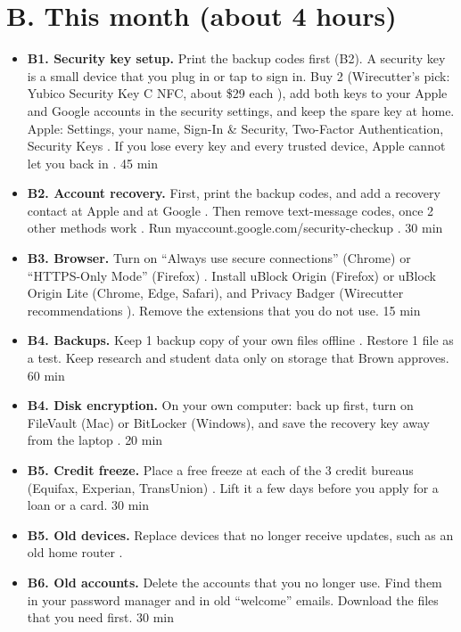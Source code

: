 \documentclass[10pt]{article}
\newcommand{\mins}[1]{\hfill{\footnotesize\color{gray}#1}}
\begin{document}
\section{B. This month (about 4 hours)}
\begin{itemize}
\item \textbf{B1. Security key setup.} Print the backup codes first (B2). A security key is a small device that you plug in or tap to sign in. Buy 2 (Wirecutter's pick: Yubico Security Key C NFC, about \$29 each \vfy), add both keys to your Apple and Google accounts in the security settings, and keep the spare key at home. Apple: Settings, your name, Sign-In \& Security, Two-Factor Authentication, Security Keys \vfy. If you lose every key and every trusted device, Apple cannot let you back in \vfy. \mins{45 min}
\item \textbf{B2. Account recovery.} First, print the backup codes, and add a recovery contact at Apple and at Google \vfy. Then remove text-message codes, once 2 other methods work \vfy. Run myaccount.google.com/security-checkup \vfy. \mins{30 min}
\item \textbf{B3. Browser.} Turn on ``Always use secure connections'' (Chrome) or ``HTTPS-Only Mode'' (Firefox) \vfy. Install uBlock Origin (Firefox) or uBlock Origin Lite (Chrome, Edge, Safari), and Privacy Badger (Wirecutter recommendations \vfy). Remove the extensions that you do not use. \mins{15 min}
\item \textbf{B4. Backups.} Keep 1 backup copy of your own files offline \vfy. Restore 1 file as a test. Keep research and student data only on storage that Brown approves. \mins{60 min}
\item \textbf{B4. Disk encryption.} On your own computer: back up first, turn on FileVault (Mac) or BitLocker (Windows), and save the recovery key away from the laptop \vfy. \mins{20 min}
\item \textbf{B5. Credit freeze.} Place a free freeze at each of the 3 credit bureaus (Equifax, Experian, TransUnion) \vfy. Lift it a few days before you apply for a loan or a card. \mins{30 min}
\item \textbf{B5. Old devices.} Replace devices that no longer receive updates, such as an old home router \vfy.
\item \textbf{B6. Old accounts.} Delete the accounts that you no longer use. Find them in your password manager and in old ``welcome'' emails. Download the files that you need first. \mins{30 min}
\end{itemize}
\end{document}
